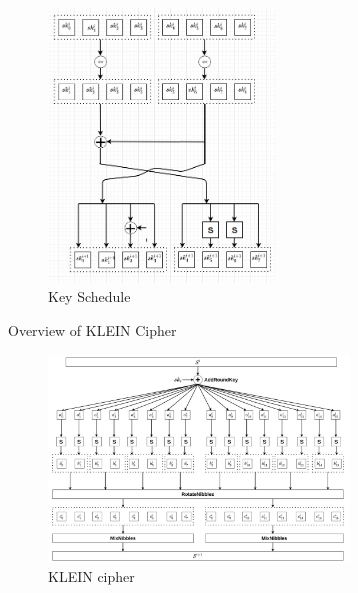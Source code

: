 \begin{frame}
\begin{figure}[h]
    \centering
    \includegraphics[width=6cm, hieght= 8cm, keepaspectratio]{images/key_schedule.jpeg}
    \caption{Key Schedule}
    \label{fig:key schedule}
\end{figure}
\end{frame}
\begin{frame}{Overview of KLEIN Cipher}
    \begin{figure}
    \centering
    \includegraphics[width=8cm, hieght= 10cm, keepaspectratio]{images/klein_cipher.jpeg}
    \caption{KLEIN cipher}
    \label{fig:overview}
\end{figure}
\end{frame}

